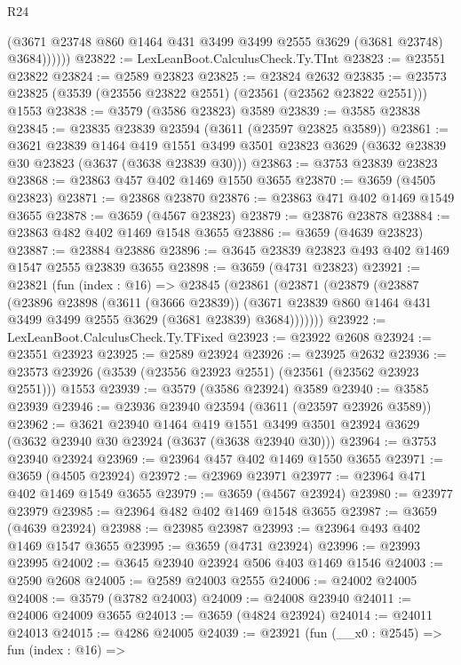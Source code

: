 \begin{lexlean}{R24}
\begin{coremodule}
              (@3671 @23748 @860 @1464 @431 @3499 @3499 @2555 @3629 (@3681 @23748) @3684))))))
@23822 := LexLeanBoot.CalculusCheck.Ty.TInt
@23823 := @23551 @23822
@23824 := @2589 @23823
@23825 := @23824 @2632
@23835 := @23573 @23825 (@3539 (@23556 @23822 @2551) (@23561 (@23562 @23822 @2551))) @1553
@23838 := @3579 (@3586 @23823) @3589
@23839 := @3585 @23838
@23845 := @23835 @23839 @23594 (@3611 (@23597 @23825 @3589))
@23861 := @3621
    @23839
    @1464
    @419
    @1551
    @3499
    @3501
    @23823
    @3629
    (@3632 @23839 @30 @23823 (@3637 (@3638 @23839 @30)))
@23863 := @3753 @23839 @23823
@23868 := @23863 @457 @402 @1469 @1550 @3655
@23870 := @3659 (@4505 @23823)
@23871 := @23868 @23870
@23876 := @23863 @471 @402 @1469 @1549 @3655
@23878 := @3659 (@4567 @23823)
@23879 := @23876 @23878
@23884 := @23863 @482 @402 @1469 @1548 @3655
@23886 := @3659 (@4639 @23823)
@23887 := @23884 @23886
@23896 := @3645 @23839 @23823 @493 @402 @1469 @1547 @2555 @23839 @3655
@23898 := @3659 (@4731 @23823)
@23921 := @23821
    (fun (index : @16) =>
    @23845
      (@23861
        (@23871
          (@23879
            (@23887
              (@23896
                @23898
                (@3611 (@3666 @23839))
                (@3671 @23839 @860 @1464 @431 @3499 @3499 @2555 @3629 (@3681 @23839) @3684)))))))
@23922 := LexLeanBoot.CalculusCheck.Ty.TFixed
@23923 := @23922 @2608
@23924 := @23551 @23923
@23925 := @2589 @23924
@23926 := @23925 @2632
@23936 := @23573 @23926 (@3539 (@23556 @23923 @2551) (@23561 (@23562 @23923 @2551))) @1553
@23939 := @3579 (@3586 @23924) @3589
@23940 := @3585 @23939
@23946 := @23936 @23940 @23594 (@3611 (@23597 @23926 @3589))
@23962 := @3621
    @23940
    @1464
    @419
    @1551
    @3499
    @3501
    @23924
    @3629
    (@3632 @23940 @30 @23924 (@3637 (@3638 @23940 @30)))
@23964 := @3753 @23940 @23924
@23969 := @23964 @457 @402 @1469 @1550 @3655
@23971 := @3659 (@4505 @23924)
@23972 := @23969 @23971
@23977 := @23964 @471 @402 @1469 @1549 @3655
@23979 := @3659 (@4567 @23924)
@23980 := @23977 @23979
@23985 := @23964 @482 @402 @1469 @1548 @3655
@23987 := @3659 (@4639 @23924)
@23988 := @23985 @23987
@23993 := @23964 @493 @402 @1469 @1547 @3655
@23995 := @3659 (@4731 @23924)
@23996 := @23993 @23995
@24002 := @3645 @23940 @23924 @506 @403 @1469 @1546
@24003 := @2590 @2608
@24005 := @2589 @24003 @2555
@24006 := @24002 @24005
@24008 := @3579 (@3782 @24003)
@24009 := @24008 @23940
@24011 := @24006 @24009 @3655
@24013 := @3659 (@4824 @23924)
@24014 := @24011 @24013
@24015 := @4286 @24005
@24039 := @23921
    (fun (__x0 : @2545) =>
    fun (index : @16) =>

\end{coremodule}
\end{lexlean}
